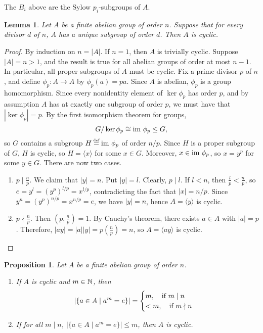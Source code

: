 \documentclass[11pt]{book}
\newcounter{counter}
\newtheorem{proposition}[counter]{Proposition}   \newtheorem{problem}[counter]{Problem}   \newtheorem*{proposition*}{Proposition}   \newtheorem*{lemma*}{Lemma}
\theoremstyle{definition}   \newtheorem{defn}[counter]{Definition} %
\newcommand\myeq{\mathrel{\overset{\makebox[0pt]{\mbox{\normalfont\tiny\sffamily \textrm{def}}}}{=}}}
\newcommand{\gen}[1]{\langle #1 \rangle}   \newcommand{\stab}[2]{\tn{Stab}_{#1}(#2)}   \newcommand{\fix}[2]{\tn{Fix}_{#1}(#2)}
\DeclareMathOperator{\ra}{\rightarrow}   \DeclareMathOperator{\Poly}{\mathbf{P}}   \DeclareMathOperator{\spn}{\textnormal{span}}   \DeclareMathOperator{\aut}{\textnormal{Aut}}
\newcommand{\vs}{\vspace{8pt}}
\numberwithin{counter}{chapter}
\begin{document}
\begin{remark*}
The $B_i$ above are the Sylow $p_i$-subgroups of $A$.
\end{remark*}

\vs

	\begin{lemma*}
	Let $A$ be a finite abelian group of order $n$. Suppose that for every divisor $d$ of $n$, $A$ has a unique subgroup of order $d$. Then $A$ is cyclic.
	\end{lemma*}

	\begin{proof}
	By induction on $n = |A|$. If $n=1$, then $A$ is trivially cyclic. Suppose $|A| = n > 1$, and the result is true for all abelian groups of order at most $n-1$. In particular, all proper subgroups of $A$ must be cyclic. Fix a prime divisor $p$ of $n$, and define $\phi_p : A \ra A$ by $\phi_p(a) = p a$. Since $A$ is abelian, $\phi_p$ is a group homomorphism. Since every nonidentity element of $\ker \phi_p$ has order $p$, and by assumption $A$ has at exactly one subgroup of order $p$, we must have that $|\ker \phi_p| = p$. By the first isomorphism theorem for groups,
		\[ G/ \ker \phi_p \cong \textnormal{im } \phi_p \leq G, \]
	so $G$ contains a subgroup $H \myeq \im \phi_p$ of order $n/p$. Since $H$ is a proper subgroup of $G$, $H$ is cyclic, so $H = \gen{x}$ for some $x \in G$. Moreover, $x \in \textnormal{im } \phi_p$, so $x = y^p$ for some $y \in G$. There are now two cases.
		\begin{enumerate}
		\item[(i)] $p \mid \frac{n}{p}$. We claim that $|y| = n$. Put $|y| = l$. Clearly, $p \mid l$. If $l < n$, then $\frac{l}{p} < \frac{n}{p}$, so $e = y^l = (y^p)^{l/p} = x^{l/p}$, contradicting the fact that $|x|=n/p$. Since $y^n = (y^p)^{n/p} = x^{n/p} = e$, we have $|y| = n$, hence $A = \gen{y}$ is cyclic.

		\item[(ii)] $p \nmid \frac{n}{p}$. Then $(p,\frac{n}{p}) = 1$. By Cauchy's theorem, there exists $a \in A$ with $|a| = p$. Therefore, $|ay| = |a| |y| = p \left( \frac{n}{p} \right) = n$, so $A = \gen{ay}$ is cyclic.
		\end{enumerate}
	\end{proof}
	\begin{proposition}
	Let $A$ be a finite abelian group of order $n$.
	\begin{enumerate}
	\item[(a)] If $A$ is cyclic and $m \in \operatorname{\mathbb{N}}$, then
		\[|\{a \in A \mid a^m = e\}| = \begin{cases}
												m, \quad \textnormal{if } m \mid n \\
												< m, \quad \textnormal{if } m \nmid n
									   \end{cases} \]
	\item[(b)] If for all $m \mid n$, $|\{a \in A \mid a^m = e\}| \leq m$, then $A$ is cyclic.
	\end{enumerate}
	\end{proposition}
\end{document}
